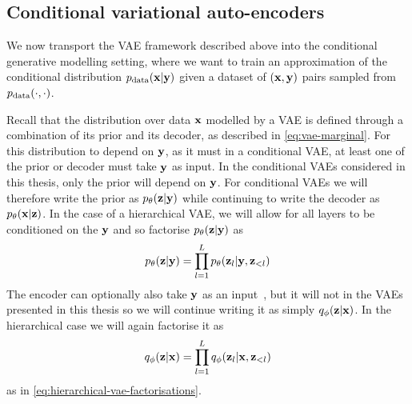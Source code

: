 \subsection{Conditional variational auto-encoders}
\label{sec:conditional-vae}
We now transport the VAE framework described above into the conditional generative modelling setting, where we want to train an approximation of the conditional distribution $p_{\rm{data}}({\mathbf{x}}|{\mathbf{y}})$ given a dataset of $({\mathbf{x}}, {\mathbf{y}})$ pairs sampled from $p_{\rm{data}}(\cdot,\cdot)$.

Recall that the distribution over data ${\mathbf{x}}$ modelled by a VAE is defined through a combination of its prior and its decoder, as described in \cref{eq:vae-marginal}. For this distribution to depend on ${\mathbf{y}}$, as it must in a conditional VAE, at least one of the prior or decoder must take ${\mathbf{y}}$ as input. In the conditional VAEs considered in this thesis, only the prior will depend on ${\mathbf{y}}$. For conditional VAEs we will therefore write the prior as $p_\theta({\mathbf{z}}|{\mathbf{y}})$ while continuing to write the decoder as $p_\theta({\mathbf{x}}|{\mathbf{z}})$. In the case of a hierarchical VAE, we will allow for all layers to be conditioned on the ${\mathbf{y}}$ and so factorise $p_\theta({\mathbf{z}}|{\mathbf{y}})$ as
\begin{equation}
    p_\theta({\mathbf{z}}|{\mathbf{y}}) = \prod_{l=1}^L p_\theta({\mathbf{z}}_l|{\mathbf{y}},{\mathbf{z}}_{<l})
\end{equation}
The encoder can optionally also take ${\mathbf{y}}$ as an input~\citep{sohn2015learning}, but it will not in the VAEs presented in this thesis so we will continue writing it as simply $q_\phi({\mathbf{z}}|{\mathbf{x}})$. In the hierarchical case we will again factorise it as
\begin{equation} \label{eq:conditional-hierarchical-vae-factorisations}
    q_\phi({\mathbf{z}}|{\mathbf{x}}) = \prod_{l=1}^L q_\phi({\mathbf{z}}_l|{\mathbf{x}},{\mathbf{z}}_{<l})
\end{equation}
as in \cref{eq:hierarchical-vae-factorisations}.


